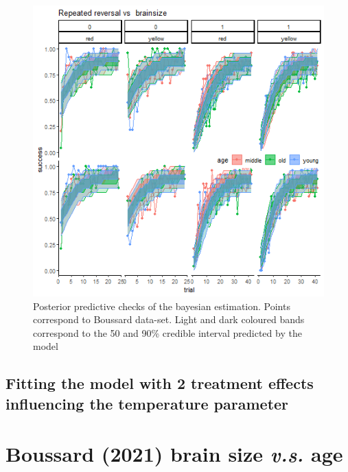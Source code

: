 \documentclass[
]{article}
\begin{document}
\begin{figure}

\includegraphics[width=6.67in,]{images/boussard2_ppchecks_colour} \hfill{}

\caption{Posterior predictive checks of the bayesian estimation. Points correspond to Boussard data-set. Light and dark coloured bands correspond to the 50 and 90\% credible interval predicted by the model}\label{fig:unnamed-chunk-12}
\end{figure}

\hypertarget{fitting-the-model-with-2-treatment-effects-influencing-the-temperature-parameter}{%
\subsection{Fitting the model with 2 treatment effects influencing the
temperature
parameter}\label{fitting-the-model-with-2-treatment-effects-influencing-the-temperature-parameter}}

\hypertarget{boussard--boussard_link_2021-brain-size-v.s.-age-1}{%
\section{\texorpdfstring{Boussard (2021) brain size \emph{v.s.}
age}{Boussard (2021) brain size v.s. age}}\label{boussard--boussard_link_2021-brain-size-v.s.-age-1}}
\end{document}
